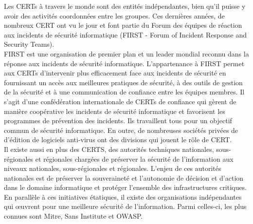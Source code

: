 Les CERTs à travers le monde sont des entités indépendantes, bien qu'il puisse y avoir des activités coordonnées entre les groupes. Ces dernières années, de nombreux CERT ont vu le jour et font partie du Forum des équipes de réaction aux incidents de sécurité informatique (FIRST  - Forum of Incident Response and Security Teams). \\
FIRST est une organisation de premier plan et un leader mondial reconnu dans la réponse aux incidents de sécurité informatique. L'appartenance à FIRST permet aux CERTs d'intervenir plus efficacement face aux incidents de sécurité en fournissant un accès aux meilleures pratiques de sécurité, à des outils de gestion de la sécurité et à une communication de confiance entre les équipes membres. Il s'agit d'une confédération internationale de CERTs de confiance qui gèrent de manière coopérative les incidents de sécurité informatique et favorisent les programmes de prévention des incidents. Ils travaillent tous pour un objectif commun de sécurité informatique. En outre, de nombreuses sociétés privées de d’édition de logiciels anti-virus ont des divisions qui jouent le rôle de CERT.\\
Il existe aussi en plus des CERTS, des autorités techniques nationales, sous-régionales et régionales chargées de préserver la sécurité de l’information aux niveaux nationales, sous-régionales et régionales. L’enjeu de ces autorités nationales est de préserver la souveraineté et l’autonomie de décision et d’action dans le domaine informatique et protéger l’ensemble des infrastructures critiques. \\
En parallèle à ces initiatives étatiques, il existe des organisations indépendantes qui œuvrent pour une meilleure sécurité de l’information. Parmi celles-ci, les plus connues sont Mitre, Sans Institute et OWASP.
